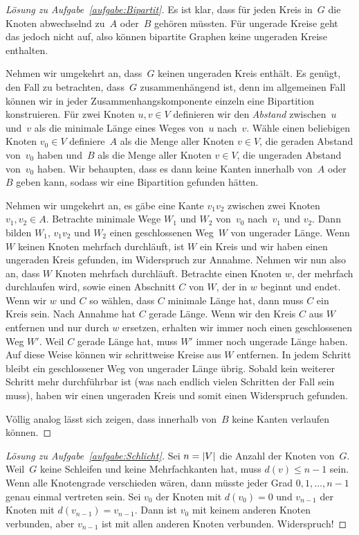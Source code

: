 \begin{proof}[Lösung zu Aufgabe~\ref{aufgabe:Bipartit}]
	Es ist klar, dass für jeden Kreis in~$G$ die Knoten abwechselnd zu~$A$ oder~$B$ gehören müssten. Für ungerade Kreise geht das jedoch nicht auf, also können bipartite Graphen keine ungeraden Kreise enthalten.
	
	Nehmen wir umgekehrt an, dass~$G$ keinen ungeraden Kreis enthält. Es genügt, den Fall zu betrachten, dass~$G$ zusammenhängend ist, denn im allgemeinen Fall können wir in jeder Zusammenhangskomponente einzeln eine Bipartition konstruieren. Für zwei Knoten $u,v\in V$ definieren wir den \emph{Abstand} zwischen~$u$ und~$v$ als die minimale Länge eines Weges von~$u$ nach~$v$. Wähle einen beliebigen Knoten $v_0\in V$ definiere~$A$ als die Menge aller Knoten $v\in V$, die geraden Abstand von~$v_0$ haben und~$B$ als die Menge aller Knoten $v\in V$, die ungeraden Abstand von~$v_0$ haben. Wir behaupten, dass es dann keine Kanten innerhalb von~$A$ oder~$B$ geben kann, sodass wir eine Bipartition gefunden hätten.
	
	Nehmen wir umgekehrt an, es gäbe eine Kante $v_1v_2$ zwischen zwei Knoten $v_1,v_2\in A$. Betrachte minimale Wege $W_1$ und $W_2$ von~$v_0$ nach~$v_1$ und $v_2$. Dann bilden $W_1$, $v_1v_2$ und $W_2$ einen geschlossenen Weg~$W$ von ungerader Länge. Wenn $W$ keinen Knoten mehrfach durchläuft, ist $W$ ein Kreis und wir haben einen ungeraden Kreis gefunden, im Widerspruch zur Annahme. Nehmen wir nun also an, dass $W$ Knoten mehrfach durchläuft. Betrachte einen Knoten $w$, der mehrfach durchlaufen wird, sowie einen Abschnitt $C$ von $W$, der in $w$ beginnt und endet. Wenn wir $w$ und $C$ so wählen, dass $C$ minimale Länge hat, dann muss $C$ ein Kreis sein. Nach Annahme hat $C$ gerade Länge. Wenn wir den Kreis $C$ aus $W$ entfernen und nur durch $w$ ersetzen, erhalten wir immer noch einen geschlossenen Weg $W'$. Weil $C$ gerade Länge hat, muss $W'$ immer noch ungerade Länge haben. Auf diese Weise können wir schrittweise Kreise aus $W$ entfernen. In jedem Schritt bleibt ein geschlossener Weg von ungerader Länge übrig. Sobald kein weiterer Schritt mehr durchführbar ist (was nach endlich vielen Schritten der Fall sein muss), haben wir einen ungeraden Kreis und somit einen Widerspruch gefunden.
	
	Völlig analog lässt sich zeigen, dass innerhalb von~$B$ keine Kanten verlaufen können.
\end{proof}
\begin{proof}[Lösung zu Aufgabe~\ref{aufgabe:Schlicht}]
	Sei $n=\abs*{V}$ die Anzahl der Knoten von~$G$. Weil~$G$ keine Schleifen und keine Mehrfachkanten hat, muss $d(v)\leqslant n-1$ sein. Wenn alle Knotengrade verschieden wären, dann müsste jeder Grad $0,1,\dotsc,n-1$ genau einmal vertreten sein. Sei $v_0$ der Knoten mit $d(v_0)=0$ und $v_{n-1}$ der Knoten mit $d(v_{n-1})=v_{n-1}$. Dann ist $v_0$ mit keinem anderen Knoten verbunden, aber $v_{n-1}$ ist mit allen anderen Knoten verbunden. Widerspruch!
\end{proof}
